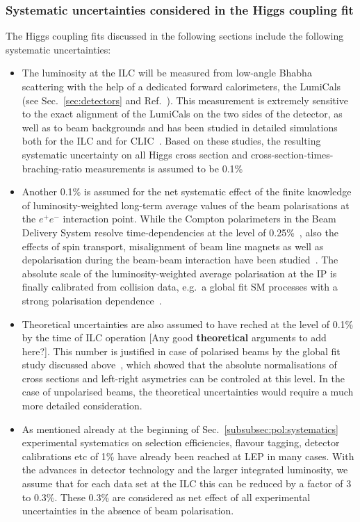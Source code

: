 \subsubsection{Systematic uncertainties considered in the Higgs coupling fit}
The Higgs coupling fits discussed in the following sections include the following systematic uncertainties:
\begin{itemize}
\item The luminosity at the ILC will be measured from low-angle Bhabha scattering with the help of a dedicated forward calorimeters, the LumiCals (see Sec.~\ref{sec:detectors} and Ref.~\cite{Abramowicz:2010bg}). This measurement is extremely sensitive to the exact alignment of the LumiCals on the two sides of the detector, as well as to beam backgrounds and has been studied in detailed simulations both for the ILC and for CLIC~\cite{Bozovic-Jelisavcic:2014aza, Lukic:2013fw}. Based on these studies, the resulting systematic uncertainty on all Higgs cross section and cross-section-times-braching-ratio measurements is assumed to be 0.1\%
\item Another 0.1\% is assumed for the net systematic effect of the finite knowledge of luminosity-weighted long-term average values of the beam polarisations at the $e^+e^-$ interaction point. While the Compton polarimeters in the Beam Delivery System resolve time-dependencies at the level of 0.25\%~\cite{Vormwald:2015hla, List:2015lsa}, also the effects of spin transport, misalignment of beam line magnets as well as depolarisation during the beam-beam interaction have been studied~\cite{Beckmann:2014mka}. The absolute scale of the luminosity-weighted average polarisation at the IP is finally calibrated from collision data, e.g.\ a global fit SM processes with a strong polarisation dependence~\cite{bib:PhDRobert}. 
\item Theoretical uncertainties are also assumed to have reched at the level of 0.1\% by the time of ILC operation {\color{red}[Any good \textbf{theoretical} arguments to add here?]}. This number is justified in case of polarised beams by the global fit study discussed above~\cite{bib:PhDRobert}, which showed that the absolute normalisations of cross sections and left-right asymetries can be controled  at this level. In the case of unpolarised beams, the theoretical uncertainties would require a much more detailed consideration.
\item As mentioned already at the beginning of Sec.~\ref{subsubsec:pol:systematics} experimental systematics on selection efficiencies, flavour tagging, detector calibrations etc of 1\% have already been reached at LEP in many cases. With the advances in detector technology and the larger integrated luminosity, we assume that for each data set at the ILC this can be reduced by a factor of 3 to 0.3\%. These 0.3\% are considered as net effect of all experimental uncertainties in the absence of beam polarisation.


\end{itemize}
